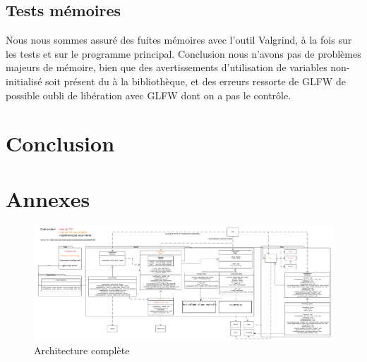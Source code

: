 \documentclass[a4paper]{article}
\begin{document}
\subsection{Tests mémoires}

Nous nous sommes assuré des fuites mémoires avec l'outil Valgrind, à la fois sur les tests et sur le programme principal.
Conclusion nous n'avons pas de problèmes majeurs de mémoire, bien que des avertissements d'utilisation de variables non-initialisé soit présent du à la bibliothèque, et des erreurs ressorte de GLFW de possible oubli de libération avec GLFW dont on a pas le contrôle.

\section{Conclusion}

\section{Annexes}

\begin{figure}[!h]
    \begin{center}
        \includegraphics[width=1.5\linewidth, angle=90]{img/archi/Architecture_complete.png} 
        \caption{Architecture complète}
        \label{archiComplete}
    \end{center}
\end{figure}




\end{document}
